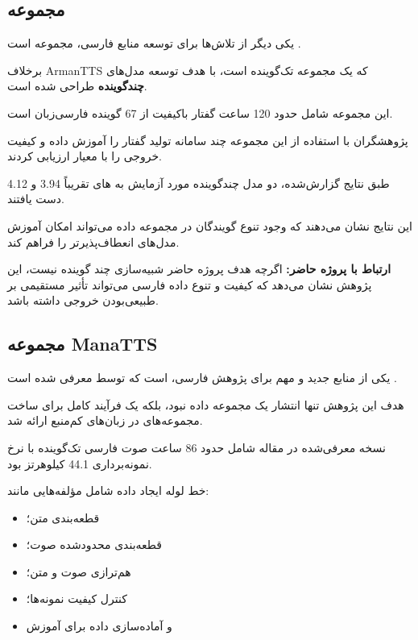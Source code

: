 \subsection{مجموعه }

یکی دیگر از تلاش‌ها برای توسعه منابع فارسی،
مجموعه
است
\cite{adibian2023deepminemultitts}.

برخلاف ArmanTTS که یک مجموعه تک‌گوینده است،
 با هدف توسعه مدل‌های
\textbf{چندگوینده}
طراحی شده است.

این مجموعه شامل حدود 120 ساعت گفتار باکیفیت از 67 گوینده
فارسی‌زبان است.

پژوهشگران با استفاده از این مجموعه چند سامانه تولید گفتار
را آموزش داده و کیفیت خروجی را با معیار  ارزیابی کردند.

طبق نتایج گزارش‌شده، دو مدل چندگوینده مورد آزمایش به
های تقریباً 3.94 و 4.12 دست یافتند.

این نتایج نشان می‌دهند که وجود تنوع گویندگان در مجموعه داده
می‌تواند امکان آموزش مدل‌های انعطاف‌پذیرتر را فراهم کند.

\textbf{ارتباط با پروژه حاضر:}
اگرچه هدف پروژه حاضر شبیه‌سازی چند گوینده نیست، این پژوهش
نشان می‌دهد که کیفیت و تنوع داده فارسی می‌تواند تأثیر مستقیمی
بر طبیعی‌بودن خروجی داشته باشد.


\subsection{مجموعه ManaTTS}

یکی از منابع جدید و مهم برای پژوهش  فارسی،
است که توسط
معرفی شده است
\cite{qharabagh2025manatts}.

هدف این پژوهش تنها انتشار یک مجموعه داده نبود، بلکه یک
فرآیند کامل برای ساخت مجموعه‌های  در زبان‌های کم‌منبع
ارائه شد.

نسخه معرفی‌شده در مقاله شامل حدود 86 ساعت صوت فارسی
تک‌گوینده با نرخ نمونه‌برداری 44.1 کیلوهرتز بود.

خط لوله ایجاد داده شامل مؤلفه‌هایی مانند:

\begin{itemize}

    \item قطعه‌بندی متن؛
    \item قطعه‌بندی محدودشده صوت؛
    \item هم‌ترازی صوت و متن؛
    \item کنترل کیفیت نمونه‌ها؛
    \item و آماده‌سازی داده برای آموزش 
\end{itemize}

